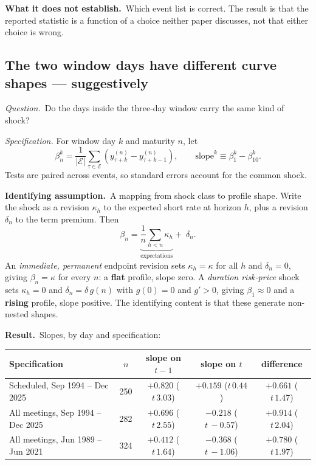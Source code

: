\documentclass[11pt]{article}
\newcommand{\qq}[1]{\vspace{0.3em}\noindent\textit{Question.}\ #1}
\newcommand{\ia}[1]{\vspace{0.4em}\noindent\textbf{Identifying assumption.}\ #1}
\newcommand{\res}[1]{\vspace{0.4em}\noindent\textbf{Result.}\ #1}
\newcommand{\limn}[1]{\vspace{0.4em}\noindent\textbf{What it does not establish.}\ #1}
\begin{document}
\limn{Which event list is correct. The result is that the reported statistic is a function of a choice neither paper discusses, not that either choice is wrong.}

\subsection{The two window days have different curve shapes --- suggestively}

\qq{Do the days inside the three-day window carry the same kind of shock?}

\vspace{0.4em}\noindent\textit{Specification.} For window day $k$ and maturity $n$, let
\begin{equation}
\beta_n^{k}=\frac{1}{|\mathcal E|}\sum_{\tau\in\mathcal E}\left(y^{(n)}_{\tau+k}-y^{(n)}_{\tau+k-1}\right),
\qquad
\text{slope}^{k}\equiv\beta_1^{k}-\beta_{10}^{k}.
\end{equation}
Tests are paired across events, so standard errors account for the common shock.

\ia{A mapping from shock class to profile shape. Write the shock as a revision $\kappa_h$ to the expected short rate at horizon $h$, plus a revision $\delta_n$ to the term premium. Then
\begin{equation}
\beta_n=\underbrace{\frac1n\sum_{h<n}\kappa_h}_{\text{expectations}}+\;\delta_n .
\end{equation}
An \emph{immediate, permanent} endpoint revision sets $\kappa_h=\kappa$ for all $h$ and $\delta_n=0$, giving $\beta_n=\kappa$ for every $n$: a \textbf{flat} profile, slope zero. A \emph{duration risk-price} shock sets $\kappa_h=0$ and $\delta_n=\delta\,g(n)$ with $g(0)=0$ and $g'>0$, giving $\beta_1\approx0$ and a \textbf{rising} profile, slope positive. The identifying content is that these generate non-nested shapes.}

\res{Slopes, by day and specification:}
\begin{table}[h]\centering\small
\begin{tabular}{lcccc}
\toprule
Specification & $n$ & slope on $t\!-\!1$ & slope on $t$ & difference\\
\midrule
Scheduled, Sep 1994 -- Dec 2025 & 250 & $+0.820$ ($t\,3.03$) & $+0.159$ ($t\,0.44$) & $+0.661$ ($t\,1.47$)\\
All meetings, Sep 1994 -- Dec 2025 & 282 & $+0.696$ ($t\,2.55$) & $-0.218$ ($t\,{-}0.57$) & $+0.914$ ($t\,2.04$)\\
All meetings, Jun 1989 -- Jun 2021 & 324 & $+0.412$ ($t\,1.64$) & $-0.368$ ($t\,{-}1.06$) & $+0.780$ ($t\,1.97$)\\
\bottomrule\end{tabular}
\end{table}
\end{document}
